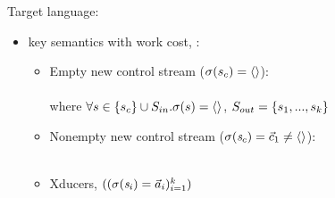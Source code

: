 \documentclass{beamer}
\begin{document}
\begin{frame}{Target language: {\fmsvcode}}
\begin{itemize}
	\item key semantics with work cost,  : \\[1ex]
	\begin{itemize}
		\item<1-> Empty new control stream ($\sigma(s_c) = \langle \rangle$): \\[2ex]
		\\[2ex]
		where $\forall s \in \{s_c\} \cup S_{in}. \sigma(s) = \langle \rangle$, $S_{out} = \{s_1,...,s_k\}$ 
		
		\item<2-> Nonempty new control stream ($\sigma(\mathit{s}_c)= \vec c_1 \ne \langle \rangle$):\\[2ex]
		\\[2ex]
	
	\item<3->  Xducers, $((\sigma(\mathit{s}_i) = \vec a_i)^k_{i=1})$ \\[2ex]
	\end{itemize}		

\end{itemize}
\end{frame}
\end{document}

